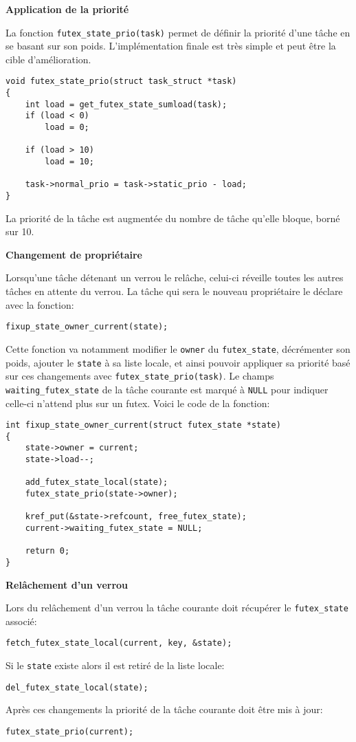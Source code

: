 \vspace{0.25cm}
\noindent \textbf{Application de la priorité}

La fonction \verb|futex_state_prio(task)| permet de définir la priorité d'une tâche en se
basant sur son poids. L'implémentation finale est très simple et peut être la cible
d'amélioration.
\begin{lstlisting}[tabsize=4]
void futex_state_prio(struct task_struct *task)
{
	int load = get_futex_state_sumload(task);
	if (load < 0)
		load = 0;
	
	if (load > 10)
		load = 10;
	
	task->normal_prio = task->static_prio - load;
}
\end{lstlisting}

La priorité de la tâche est augmentée du nombre de tâche qu'elle bloque, borné sur 10.

\vspace{0.25cm}
\noindent \textbf{Changement de propriétaire}

Lorsqu'une tâche détenant un verrou le relâche, celui-ci réveille toutes les autres tâches en attente
du verrou. La tâche qui sera le nouveau propriétaire le déclare avec la fonction:
\begin{lstlisting}[tabsize=4]
	fixup_state_owner_current(state);
\end{lstlisting}
Cette fonction va notamment modifier le \verb|owner| du \verb|futex_state|, décrémenter son poids, ajouter 
le \verb|state| à sa liste locale, et ainsi pouvoir appliquer sa priorité basé sur ces changements avec
\verb|futex_state_prio(task)|. Le champs \verb|waiting_futex_state| de la tâche courante est marqué à \verb|NULL|
pour indiquer celle-ci n'attend plus sur un futex. Voici le code de la fonction:

\begin{lstlisting}[tabsize=4]
int fixup_state_owner_current(struct futex_state *state)
{
	state->owner = current;
	state->load--;
	
	add_futex_state_local(state);
	futex_state_prio(state->owner);
	
	kref_put(&state->refcount, free_futex_state);
	current->waiting_futex_state = NULL;
	
	return 0;
}
\end{lstlisting}

\vspace{0.25cm}
\noindent \textbf{Relâchement d'un verrou}

Lors du relâchement d'un verrou la tâche courante doit récupérer le \verb|futex_state| associé:
\begin{lstlisting}[tabsize=4]
	fetch_futex_state_local(current, key, &state);
\end{lstlisting}
Si le \verb|state| existe alors il est retiré de la liste locale:
\begin{lstlisting}[tabsize=4]
	del_futex_state_local(state);
\end{lstlisting}
Après ces changements la priorité de la tâche courante doit être mis à jour:
\begin{lstlisting}[tabsize=4]
	futex_state_prio(current);
\end{lstlisting}

